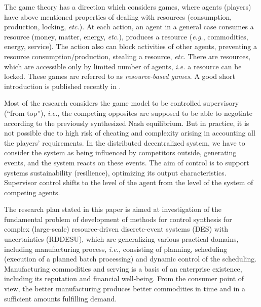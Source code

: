 \documentclass[conference]{IEEEtran}
\begin{document}

The game theory has a direction which considers games, where agents (players) have above mentioned properties of dealing with resources (consumption, production, locking, \emph{etc.}).  At each action, an agent in a general case consumes a resource (money, matter, energy, \emph{etc.}), produces a resource (\emph{e.g.}, commodities, energy, service).  The action also can block activities of other agents, preventing a resource consumption/production, stealing a resource, \emph{etc.}  There are resources, which are accessible only by limited number of agents, \emph{i.e.} a resource can be locked. These games are referred to as \emph{resource-based games}. A good short introduction is published recently in \cite{rbg}.

Most of the research considers the game model to be controlled supervisory (“from top”), \emph{i.e.}, the competing opposites are supposed to be able to negotiate according to the previously synthesized Nash equilibrium. But in practice, it is not possible due to high risk of cheating and complexity arising in accounting all the players’ requirements. In the distributed decentralized system, we have to consider the system as being influenced by competitors outside, generating events, and the system reacts on these events. The aim of control is to support systems sustainability (resilience), optimizing its output characteristics. Supervisor control shifts to the level of the agent from the level of the system of competing agents. %

The research plan stated in this paper is aimed at investigation of the fundamental problem of development of methods for control synthesis for complex (large-scale) resource-driven discrete-event systems (DES) with uncertainties (RDDESU), which are generalizing various practical domains, including manufacturing process, \emph{i.e.}, consisting of planning, scheduling (execution of a planned batch processing) and dynamic control of the scheduling.  Manufacturing commodities and serving is a basis of an enterprise existence, including its reputation and financial well-being. From the consumer point of view, the better manufacturing produces better commodities in time and in a sufficient amounts fulfilling demand.
\end{document}
